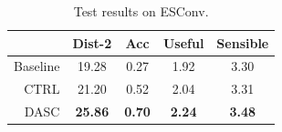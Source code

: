 \begin{table}[th]
    \centering
    \small
    \begin{tabular}{rcccc}
        \hline
             & Dist-2         & Acc           & Useful        & Sensible      \\ \hline
    Baseline & 19.28          & 0.27          & 1.92          & 3.30          \\
    CTRL     & 21.20          & 0.52          & 2.04          & 3.31          \\
    DASC     & \textbf{25.86} & \textbf{0.70} & \textbf{2.24} & \textbf{3.48} \\ \hline
    \end{tabular}
    \caption{Test results on ESConv.}
    \label{tab:esconv_results}
\end{table}

